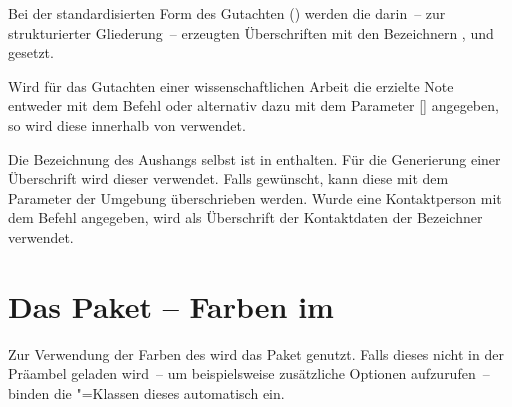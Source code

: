 \begin{Declaration}{}
\begin{Declaration}{}
\printdeclarationlist%
%
Bei der standardisierten Form des Gutachten () werden die 
darin~-- zur strukturierter Gliederung~-- erzeugten Überschriften mit den 
Bezeichnern ,  und  
gesetzt.
\end{Declaration}
\end{Declaration}

\begin{Declaration}{}
\printdeclarationlist%
%
Wird für das Gutachten einer wissenschaftlichen Arbeit die erzielte Note 
entweder mit dem Befehl  oder alternativ dazu mit 
dem Parameter [] angegeben, so 
wird diese innerhalb von  verwendet.
\end{Declaration}

\begin{Declaration}{}
\begin{Declaration}{}
\printdeclarationlist%
%
Die Bezeichnung des Aushangs selbst ist in  enthalten. Für 
die Generierung einer Überschrift wird dieser verwendet. Falls gewünscht, kann 
diese mit dem Parameter  der Umgebung 
 überschrieben werden. Wurde eine Kontaktperson mit dem 
Befehl  angegeben, wird als Überschrift der Kontaktdaten 
der Bezeichner  verwendet.

\end{Declaration}
\end{Declaration}



\section{Das Paket  -- Farben im \CD}%
%
%
Zur Verwendung der Farben des \CDs wird das Paket  
genutzt. Falls dieses nicht in der Präambel geladen wird~-- um beispielsweise 
zusätzliche Optionen aufzurufen~-- binden die \TUDScript"=Klassen dieses 
automatisch ein.

